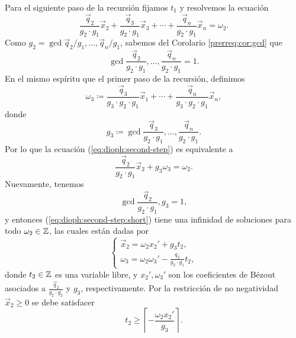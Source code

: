 Para el siguiente paso de la recursión fijamos $t_1$ y resolvemos la ecuación
\begin{equation}
	\label{eq:dioph:second-step}
	\frac{\vec{q}_2}{g_2 \cdot g_1}\vec{x}_2 +
	\frac{\vec{q}_3}{g_2 \cdot g_1}\vec{x}_3 +
	\cdots +
	\frac{\vec{q}_n}{g_2 \cdot g_1}\vec{x}_n
	= \omega_2.
\end{equation}
Como $g_2 = \gcd{\vec{q}_2/g_1, \ldots, \vec{q}_n/g_1}$, sabemos del Corolario \ref{prerreq:cor:gcd}
que
\begin{equation*}
	\gcd{\frac{\vec{q}_2}{g_2 \cdot g_1}, \ldots, \frac{\vec{q}_n}{g_2 \cdot g_1}} = 1.
\end{equation*}
En el mismo espíritu que el primer paso de la recursión, definimos
\begin{equation*}
	\omega_3 \coloneq \frac{\vec{q}_3}{g_3 \cdot g_2 \cdot g_1}\vec{x}_1 + \cdots + \frac{\vec{q}_n}{g_3
	\cdot g_2 \cdot g_1}\vec{x}_n,
\end{equation*}
donde
\begin{equation*}
	g_3 \coloneq  \gcd{\frac{\vec{q}_3}{g_2 \cdot g_1}, \ldots, \frac{\vec{q}_n}{g_2 \cdot g_1}}.
\end{equation*}
Por lo que la ecuación (\ref{eq:dioph:second-step}) es equivalente a
\begin{equation}
	\label{eq:dioph:second-step:short}
	\frac{\vec{q}_2}{g_2 \cdot g_1}\vec{x}_2 + g_3\omega_3 = \omega_2.
\end{equation}
Nuevamente, tenemos
\begin{equation*}
	\gcd{\frac{\vec{q}_2}{g_2 \cdot g_1}, g_3} = 1,
\end{equation*}
y entonces (\ref{eq:dioph:second-step:short}) tiene una infinidad de soluciones para todo $\omega_2 \in
\mathbb{Z}$, las cuales están dadas por
\begin{equation*}
	\begin{cases}
		\vec{x}_2 = \omega_2x_2' + g_3t_2, \\
		\omega_3 = \omega_2\omega_3' - \frac{q_2}{g_2 \cdot g_1}t_2,
	\end{cases}
\end{equation*}
donde $t_2 \in \mathbb{Z}$ es una variable libre, y $x_2', \omega_3'$ son los coeficientes de Bézout
asociados a $\frac{\vec{q}_2}{g_2 \cdot g_2}$ y $g_3$, respectivamente. Por la restricción de no
negatividad $\vec{x}_2 \geq 0$ se debe satisfacer
\begin{equation*}
	t_2 \geq \left\lceil -\frac{\omega_2x_2'}{g_3} \right\rceil.
\end{equation*}

